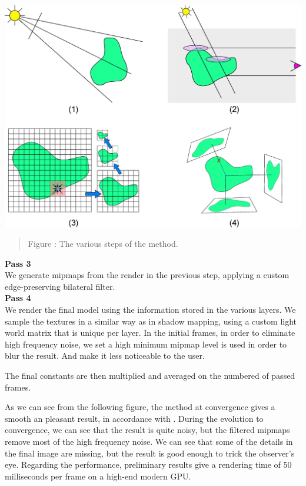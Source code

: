 \documentclass[landscape,a0b,final,a4resizeable]{a0poster}
\newenvironment{poster}{
	\begin{center} \begin{minipage}[c]{0.98\textwidth} }{
	\end{minipage} \end{center}
}
\newcommand{\pbox}[4]{
	\psshadowbox[#3]{
		\begin{minipage}[t][#2][t]{#1}
			#4
		\end{minipage}
}}
\newcommand{\csection}[1]{
\vspace{0.1cm}
\begin{center}
	\pbox{0.8\columnwidth}{}{linewidth=2mm, framearc=0.0, linecolor=lightgreen, fillstyle=gradient,
	                         gradangle=0, gradbegin=white, gradend=whitegreen, gradmidpoint=1.0, framesep=0.6em, shadowsize=0
	                        }{\begin{center}{\bf \large #1}\end{center}}
\end{center}
\vspace{0.1cm}
}
\newcommand{\fcaption}[1]{
  \vspace{0.3cm}
  \begin{quote}
	\centering
    {{\sc Figure} \arabic{figure}: \small {#1}}
  \end{quote}
  \vspace{0.6cm}
  \stepcounter{figure}
}
\begin{document}
\begin{poster}
\begin{multicols}{3}
\begin{center}
\includegraphics[scale = 0.8]{./images/combination4.eps} 
\fcaption{The various steps of the method.}
\end{center}


\textbf{Pass 3} 
\\
We generate mipmaps from the render in the previous step, applying a custom edge-preserving bilateral filter.  
\\
\textbf{Pass 4} 
\\
We render the final model using the information stored in the various layers. We sample the textures in a similar way as in shadow mapping, using a custom light world matrix that is unique per layer. In the initial frames, in order to eliminate high frequency noise, we set a high minimum mipmap level is used in order to blur the result. And make it less noticeable to the user. 

The final constants are then multiplied and averaged on the numbered of passed frames.

\csection{Results}
As we can see from the following figure, the method at convergence gives a smooth an pleasant result, in accordance with \cite{IMM2013-06646}. During the evolution to convergence, we can see that the result is quite noisy, but the filtered mipmaps remove most of the high frequency noise. We can see that some of the details in the final image are missing, but the result is good enough to trick the observer's eye. Regarding the performance, preliminary results give a rendering time of 50 milliseconds per frame on a high-end modern GPU.


\end{multicols}
\end{poster}
\end{document}
